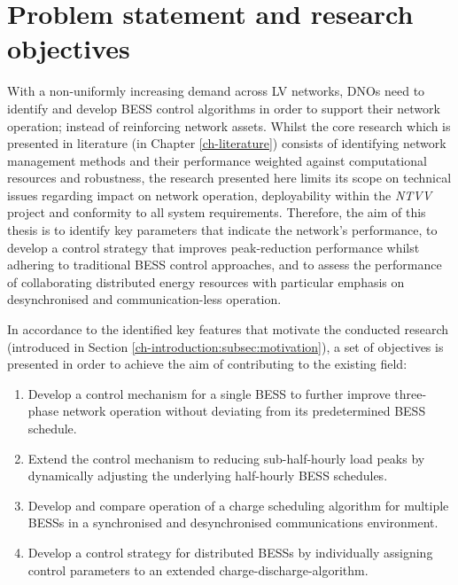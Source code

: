 \section{Problem statement and research objectives}
\label{ch-introduction:sec:problem-statement}

With a non-uniformly increasing demand across LV networks, DNOs need to identify and develop BESS control algorithms in order to support their network operation; instead of reinforcing network assets.
Whilst the core research which is presented in literature (in Chapter \ref{ch-literature}) consists of identifying network management methods and their performance weighted against computational resources and robustness, the research presented here limits its scope on technical issues regarding impact on network operation, deployability within the \textit{NTVV} project and conformity to all system requirements.
Therefore, the aim of this thesis is to identify key parameters that indicate the network's performance, to develop a control strategy that improves peak-reduction performance whilst adhering to traditional BESS control approaches, and to assess the performance of collaborating distributed energy resources with particular emphasis on desynchronised and communication-less operation.

In accordance to the identified key features that motivate the conducted research (introduced in Section \ref{ch-introduction:subsec:motivation}), a set of objectives is presented in order to achieve the aim of contributing to the existing field:

\begin{enumerate}
	\item Develop a control mechanism for a single BESS to further improve three-phase network operation without deviating from its predetermined BESS schedule.
	\item Extend the control mechanism to reducing sub-half-hourly load peaks by dynamically adjusting the underlying half-hourly BESS schedules.
	\item Develop and compare operation of a charge scheduling algorithm for multiple BESSs in a synchronised and desynchronised communications environment.
	\item Develop a control strategy for distributed BESSs by individually assigning control parameters to an extended charge-discharge-algorithm.
\end{enumerate}

